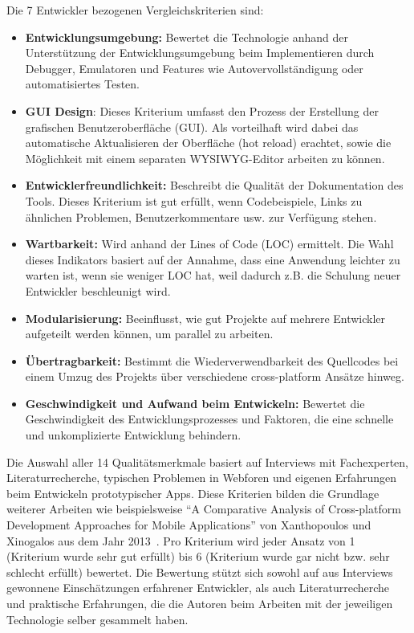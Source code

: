 Die 7 Entwickler bezogenen Vergleichskriterien sind:
\begin{itemize}
    \item \textbf{Entwicklungsumgebung:} Bewertet die Technologie anhand der Unterstützung der Entwicklungsumgebung beim Implementieren durch Debugger, Emulatoren und Features wie Autovervollständigung oder automatisiertes Testen.
    \item \textbf{GUI Design}: Dieses Kriterium umfasst den Prozess der Erstellung der grafischen Benutzeroberfläche (GUI). Als vorteilhaft wird dabei das automatische Aktualisieren der Oberfläche (hot reload) erachtet, sowie die Möglichkeit mit einem separaten WYSIWYG-Editor arbeiten zu können.
    \item \textbf{Entwicklerfreundlichkeit:} Beschreibt die Qualität der Dokumentation des Tools. Dieses Kriterium ist gut erfüllt, wenn Codebeispiele, Links zu ähnlichen Problemen, Benutzerkommentare usw. zur Verfügung stehen.
    \item \textbf{Wartbarkeit:} Wird anhand der Lines of Code (LOC) ermittelt. Die Wahl dieses Indikators basiert auf der Annahme, dass eine Anwendung leichter zu warten ist, wenn sie weniger LOC hat, weil dadurch z.B. die Schulung neuer Entwickler beschleunigt wird.
    \item \textbf{Modularisierung:} Beeinflusst, wie gut Projekte auf mehrere Entwickler aufgeteilt werden können, um parallel zu arbeiten.
    \item \textbf{Übertragbarkeit:} Bestimmt die Wiederverwendbarkeit des Quellcodes bei einem Umzug des Projekts über verschiedene cross-platform Ansätze hinweg.
    \item \textbf{Geschwindigkeit und Aufwand beim Entwickeln:} Bewertet die Geschwindigkeit des Entwicklungsprozesses und Faktoren, die eine schnelle und unkomplizierte Entwicklung behindern.
\end{itemize}
Die Auswahl aller 14 Qualitätsmerkmale basiert auf Interviews mit Fachexperten, Literaturrecherche, typischen Problemen in Webforen und eigenen Erfahrungen beim Entwickeln prototypischer Apps.
Diese Kriterien bilden die Grundlage weiterer Arbeiten wie beispielsweise “A Comparative Analysis of Cross-platform Development Approaches for Mobile Applications” von Xanthopoulos und Xinogalos aus dem Jahr 2013~\cite{compa13}.
Pro Kriterium wird jeder Ansatz von 1 (Kriterium wurde sehr gut erfüllt) bis 6 (Kriterium wurde gar nicht bzw. sehr schlecht erfüllt) bewertet. Die Bewertung stützt sich sowohl auf aus Interviews gewonnene Einschätzungen erfahrener Entwickler, als auch Literaturrecherche und praktische Erfahrungen, die die Autoren beim Arbeiten mit der jeweiligen Technologie selber gesammelt haben.\\ \\
